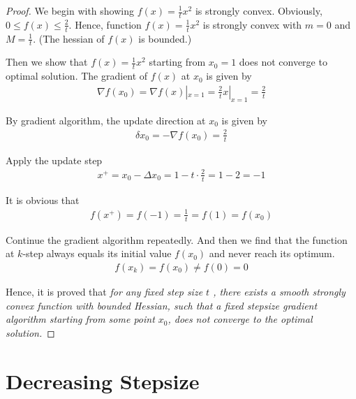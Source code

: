\documentclass[11pt,a4paper]{article}
\begin{document}
\begin{proof}
    We begin with showing $f(x) = \frac{1}{t} x^2$ is strongly convex.
    Obviously, $0 \leq f(x) \leq \frac{2}{t}$. 
    Hence, function $f(x) = \frac{1}{t} x^2$ is strongly convex with $m = 0$
    and $M = \frac{1}{t}$. (The hessian of $f(x)$ is bounded.)

    Then we show that $f(x) = \frac{1}{t} x^2$ starting from $x_0 = 1$ does
    not converge to optimal solution. The gradient of $f(x)$ at $x_0$ is given
    by
    \begin{align}
        \nabla f(x_0)
        = \nabla f(x)|_{x=1} 
        = \frac{2}{t} x |_{x=1} 
        = \frac{2}{t}
    \end{align}

    By gradient algorithm, the update direction at $x_0$ is given by
    \begin{align}
        \delta x_0 = - \nabla f(x_0) = \frac{2}{t}
    \end{align}

    Apply the update step
    \begin{align}
        x^{+} = x_0 - \Delta x_0 = 1 - t \cdot \frac{2}{t} = 1 - 2 = -1
    \end{align}

    It is obvious that 
    \begin{align}
        f(x^{+}) = f(-1) = \frac{1}{t}  = f(1) = f(x_0)
    \end{align}

    Continue the gradient algorithm repeatedly. And then we find that the function at
    $k$-step always equals its initial value $f(x_0)$ and never reach its optimum.
    \begin{align}
        f(x_{k}) = f (x_0) \not = f(0) = 0
    \end{align}

    Hence, it is proved that 
       {\it for any fixed step size $t$ , there exists a smooth
            strongly convex function with bounded Hessian, such that a fixed
            stepsize gradient algorithm starting from some point  $x_0$, does
            not converge to the optimal solution.}
\end{proof}

\newpage
\section{Decreasing Stepsize}
\end{document}
